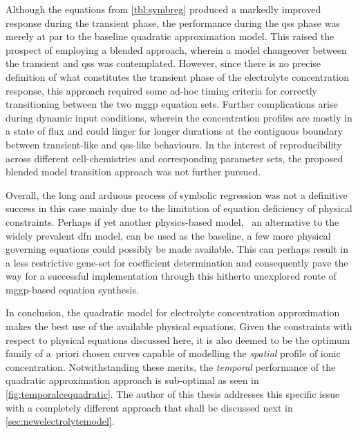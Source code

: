 Although  the equations  from \cref{tbl:symbreg}  produced  a markedly  improved
response during the transient phase,  the performance during the \gls{qss} phase
was merely at par to the baseline quadratic approximation model. This raised the
prospect of  employing a  blended approach, wherein  a model  changeover between
the  transient  and \gls{qss}  was  contemplated.  However,  since there  is  no
precise definition  of what constitutes  the transient phase of  the electrolyte
concentration response, this  approach required some ad-hoc  timing criteria for
correctly  transitioning  between  the  two \gls{mggp}  equation  sets.  Further
complications arise  during dynamic input conditions,  wherein the concentration
profiles are mostly in a state of  flux and could linger for longer durations at
the contiguous  boundary between  transient-like and  \gls{qss}-like behaviours.
In  the  interest  of  reproducibility  across  different  cell-chemistries  and
corresponding parameter sets, the proposed blended model transition approach was
not further pursued.

Overall,  the  long  and  arduous  process of  symbolic  regression  was  not  a
definitive  success in  this  case  mainly due  to  the  limitation of  equation
deficiency of physical constraints. Perhaps  if yet another physics-based model,
\ie~an  alternative to the  widely prevalent \gls{dfn}  model, can be  used as
the  baseline,  a  few  more  physical governing  equations  could  possibly  be
made  available. This  can perhaps  result in  a less  restrictive gene-set  for
coefficient  determination  and  consequently  pave the  way  for  a  successful
implementation  through  this  hitherto  unexplored  route  of  \gls{mggp}-based
equation synthesis.

In conclusion,  the quadratic model for  electrolyte concentration approximation
makes the  best use of the  available physical equations. Given  the constraints
with  respect to  physical equations  discussed here,  it is  also deemed  to be
the  optimum  family  of  a~priori  chosen  curves  capable  of  modelling  the
\emph{spatial}  profile of  ionic concentration.  Notwithstanding these  merits,
the  \emph{temporal}  performance of  the  quadratic  approximation approach  is
sub-optimal as seen in \cref{fig:temporalcequadratic}. The author of this thesis
addresses this specific issue with a completely different approach that shall be
discussed next in \cref{sec:newelectrolytemodel}.

